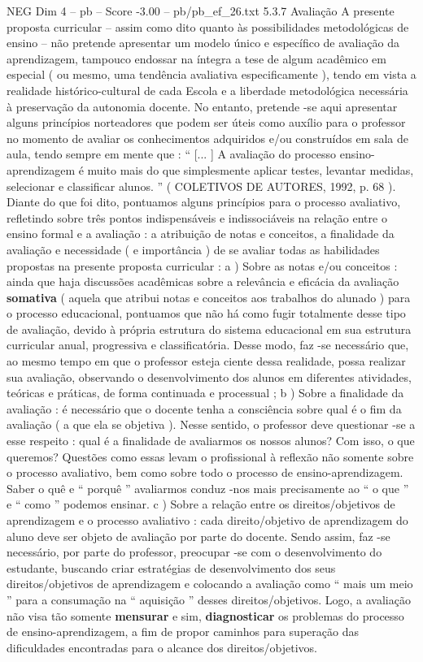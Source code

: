 \begin{textsample}{NEG Dim 4 – pb – Score -3.00 – pb/pb\_ef\_26.txt}  \label{ex:f4_neg_025}
5.3.7 Avaliação A presente proposta curricular – assim como dito quanto às possibilidades metodológicas de ensino – não pretende apresentar um modelo único e específico de avaliação da aprendizagem, tampouco endossar na íntegra a tese de algum acadêmico em especial ( ou mesmo, uma tendência avaliativa especificamente ), tendo em vista a realidade histórico-cultural de cada Escola e a liberdade metodológica necessária à preservação da autonomia docente.
No entanto, pretende -se aqui apresentar alguns princípios norteadores que podem ser úteis como auxílio para o professor no momento de avaliar os conhecimentos adquiridos e/ou construídos em sala de aula, tendo sempre em mente que : “ [... ] A avaliação do processo ensino-aprendizagem é muito mais do que simplesmente aplicar testes, levantar medidas, selecionar e classificar alunos. ” ( COLETIVOS DE AUTORES, 1992, p. 68 ).
Diante do que foi dito, pontuamos alguns princípios para o processo avaliativo, refletindo sobre três pontos indispensáveis e indissociáveis na relação entre o ensino formal e a avaliação : a atribuição de notas e conceitos, a finalidade da avaliação e necessidade ( e importância ) de se avaliar todas as habilidades propostas na presente proposta curricular : a ) Sobre as notas e/ou conceitos : ainda que haja discussões acadêmicas sobre a relevância e eficácia da avaliação \textbf{somativa} ( aquela que atribui notas e conceitos aos trabalhos do alunado ) para o processo educacional, pontuamos que não há como fugir totalmente desse tipo de avaliação, devido à própria estrutura do sistema educacional em sua estrutura curricular anual, progressiva e classificatória.
Desse modo, faz -se necessário que, ao mesmo tempo em que o professor esteja ciente dessa realidade, possa realizar sua avaliação, observando o desenvolvimento dos alunos em diferentes atividades, teóricas e práticas, de forma continuada e processual ; b ) Sobre a finalidade da avaliação : é necessário que o docente tenha a consciência sobre qual é o fim da avaliação ( a que ela se objetiva ).
Nesse sentido, o professor deve questionar -se a esse respeito : qual é a finalidade de avaliarmos os nossos alunos?
Com isso, o que queremos?
Questões como essas levam o profissional à reflexão não somente sobre o processo avaliativo, bem como sobre todo o processo de ensino-aprendizagem.
Saber o quê e “ porquê ” avaliarmos conduz -nos mais precisamente ao “ o que ” e “ como ” podemos ensinar. c ) Sobre a relação entre os direitos/objetivos de aprendizagem e o processo avaliativo : cada direito/objetivo de aprendizagem do aluno deve ser objeto de avaliação por parte do docente.
Sendo assim, faz -se necessário, por parte do professor, preocupar -se com o desenvolvimento do estudante, buscando criar estratégias de desenvolvimento dos seus direitos/objetivos de aprendizagem e colocando a avaliação como “ mais um meio ” para a consumação na “ aquisição ” desses direitos/objetivos.
Logo, a avaliação não visa tão somente \textbf{mensurar} e sim, \textbf{diagnosticar} os problemas do processo de ensino-aprendizagem, a fim de propor caminhos para superação das dificuldades encontradas para o alcance dos direitos/objetivos.

\end{textsample}
